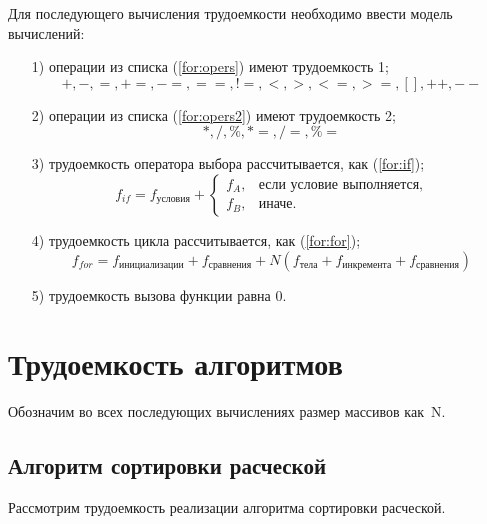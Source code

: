 Для последующего вычисления трудоемкости необходимо ввести модель вычислений:
\begin{enumerate}
    \item[1)] операции из списка (\ref{for:opers}) имеют трудоемкость 1;
        \begin{equation}
            \label{for:opers}
            +, -, =, +=, -=, ==, !=, <, >, <=, >=, [], ++, {-}-
        \end{equation}
    \item[2)] операции из списка (\ref{for:opers2}) имеют трудоемкость 2;
        \begin{equation}
            \label{for:opers2}
            *, /, \%, *=, /=, \%=
        \end{equation}
    \clearpage
    \item[3)] трудоемкость оператора выбора  рассчитывается, как (\ref{for:if});
        \begin{equation}
            \label{for:if}
            f_{if} = f_{\text{условия}} +
            \begin{cases}
            f_A, & \text{если условие выполняется,}\\
            f_B, & \text{иначе.}
            \end{cases}
        \end{equation}
    \item[4)] трудоемкость цикла рассчитывается, как (\ref{for:for});
        \begin{equation}
            \label{for:for}
            f_{for} = f_{\text{инициализации}} + f_{\text{сравнения}} + N(f_{\text{тела}} + f_{\text{инкремента}} + f_{\text{сравнения}})
        \end{equation}
	\item[5)] трудоемкость вызова функции равна 0.
\end{enumerate}

\section{Трудоемкость алгоритмов}

Обозначим во всех последующих вычислениях размер массивов \mbox{как N}.

\subsection{Алгоритм сортировки расческой}

Рассмотрим трудоемкость реализации алгоритма сортировки расческой.


